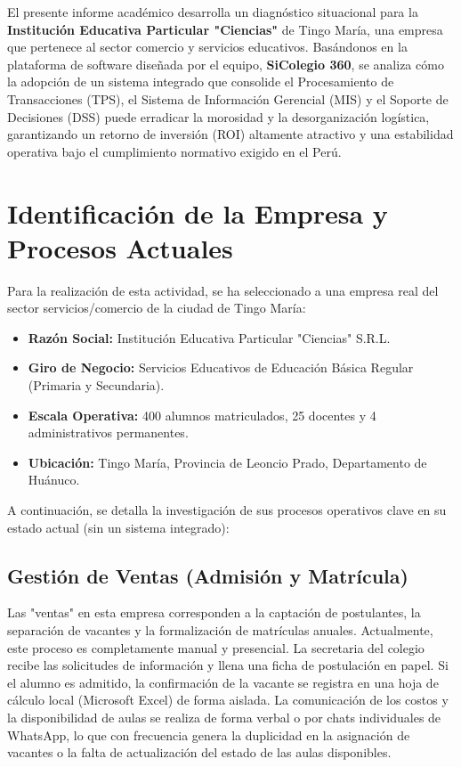 \documentclass[12pt,a4paper,oneside]{report}
\begin{document}
El presente informe académico desarrolla un diagnóstico situacional para la \textbf{Institución Educativa Particular "Ciencias"} de Tingo María, una empresa que pertenece al sector comercio y servicios educativos. Basándonos en la plataforma de software diseñada por el equipo, \textbf{SiColegio 360}, se analiza cómo la adopción de un sistema integrado que consolide el Procesamiento de Transacciones (TPS), el Sistema de Información Gerencial (MIS) y el Soporte de Decisiones (DSS) puede erradicar la morosidad y la desorganización logística, garantizando un retorno de inversión (ROI) altamente atractivo y una estabilidad operativa bajo el cumplimiento normativo exigido en el Perú.

\newpage


\section{Identificación de la Empresa y Procesos Actuales}

Para la realización de esta actividad, se ha seleccionado a una empresa real del sector servicios/comercio de la ciudad de Tingo María:

\begin{itemize}
    \item \textbf{Razón Social:} Institución Educativa Particular "Ciencias" S.R.L.
    \item \textbf{Giro de Negocio:} Servicios Educativos de Educación Básica Regular (Primaria y Secundaria).
    \item \textbf{Escala Operativa:} 400 alumnos matriculados, 25 docentes y 4 administrativos permanentes.
    \item \textbf{Ubicación:} Tingo María, Provincia de Leoncio Prado, Departamento de Huánuco.
\end{itemize}

A continuación, se detalla la investigación de sus procesos operativos clave en su estado actual (sin un sistema integrado):

\subsection{Gestión de Ventas (Admisión y Matrícula)}
Las "ventas" en esta empresa corresponden a la captación de postulantes, la separación de vacantes y la formalización de matrículas anuales. Actualmente, este proceso es completamente manual y presencial. La secretaria del colegio recibe las solicitudes de información y llena una ficha de postulación en papel. Si el alumno es admitido, la confirmación de la vacante se registra en una hoja de cálculo local (Microsoft Excel) de forma aislada. La comunicación de los costos y la disponibilidad de aulas se realiza de forma verbal o por chats individuales de WhatsApp, lo que con frecuencia genera la duplicidad en la asignación de vacantes o la falta de actualización del estado de las aulas disponibles.
\end{document}
